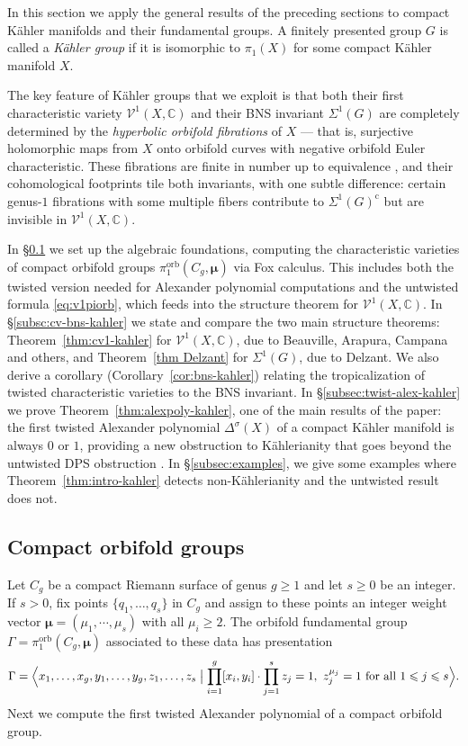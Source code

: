\documentclass[11pt]{amsart}
\theoremstyle{definition}
\newcommand{\C}{\mathbb{C}}
\newcommand{\VV}{\mathcal{V}}
\DeclareMathOperator{\orb}{orb}
\newcommand{\compl}{\mathrm{c}}
\begin{document}
In this section we apply the general results of the 
preceding sections to compact K\"{a}hler manifolds and 
their fundamental groups. A finitely presented group $G$ 
is called a \emph{K\"{a}hler group} if it is isomorphic 
to $\pi_1(X)$ for some compact K\"{a}hler manifold $X$.

The key feature of K\"{a}hler groups that we exploit 
is that both their first characteristic variety $\VV^1(X,\C)$ 
and their BNS invariant $\Sigma^1(G)$ are completely 
determined by the \emph{hyperbolic orbifold fibrations} 
of $X$ — that is, surjective holomorphic maps from $X$ 
onto orbifold curves with negative orbifold Euler 
characteristic. These fibrations are finite in number 
up to equivalence \cite[Thm.~2]{De08}, and their 
cohomological footprints tile both invariants, with 
one subtle difference: certain genus-$1$ fibrations 
with some multiple fibers contribute to 
$\Sigma^1(G)^{\compl}$ but are invisible in $\VV^1(X,\C)$.

In \S\ref{subsec:orbifolds} we set up the algebraic 
foundations, computing the characteristic varieties 
of compact orbifold groups $\pi_1^{\orb}(C_g,\bm{\mu})$ 
via Fox calculus. This includes both the twisted version 
needed for Alexander polynomial computations and the 
untwisted formula \eqref{eq:v1piorb}, which feeds into 
the structure theorem for $\VV^1(X,\C)$.
In \S\ref{subsc:cv-bns-kahler} we state and compare 
the two main structure theorems: Theorem~\ref{thm:cv1-kahler} 
for $\VV^1(X,\C)$, due to Beauville, Arapura, Campana and 
others, and Theorem~\ref{thm Delzant} for $\Sigma^1(G)$, 
due to Delzant. We also derive a corollary 
(Corollary~\ref{cor:bns-kahler}) relating the tropicalization 
of twisted characteristic varieties to the BNS invariant. 
In \S\ref{subsec:twist-alex-kahler} we prove 
Theorem~\ref{thm:alexpoly-kahler}, one of the main results 
of the paper: the first twisted Alexander polynomial 
$\Delta^\sigma(X)$ of a compact K\"{a}hler manifold is 
always $0$ or $1$, providing a new obstruction to 
K\"{a}hlerianity that goes beyond the untwisted DPS 
obstruction \cite{DPS-imrn}. In \S\ref{subsec:examples}, we give some 
examples where Theorem~\ref{thm:intro-kahler} detects non-K\"ahlerianity
and the untwisted result does not.
\subsection{Compact orbifold groups}
\label{subsec:orbifolds}
Let $C_{g}$ be a compact Riemann surface of genus 
$g\geqslant 1$ and let $s\geqslant 0$ be an integer. If $s>0$, fix points 
$\{q_1,\ldots,q_s\}$ in $C_g$ and  assign to these points an integer weight 
vector ${\bm \mu}=(\mu_1,\cdots,\mu_s)$ with all $\mu_i\geqslant 2$.
The orbifold fundamental group $\Gamma=\pi_1^{\orb}(C_{g},{\bm \mu})$ 
associated to these data has presentation  
\[ 
\Gamma=\Bigl\langle x_{1},\ldots,x_{g},y_{1},\ldots,y_{g},z_{1},\ldots,z_{s} \bigm| \prod_{i=1}^{g}
[x_{i},y_{i}]\cdot\prod_{j=1}^{s} z_{j}=1, \ z_{j}^{\mu_{j}}=1 \text{ for all } 1\leqslant 
j\leqslant s   \Bigr\rangle. 
\]
Next we compute the first twisted Alexander polynomial of a compact orbifold group.
\end{document}
